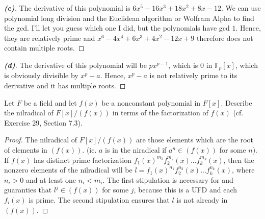 \documentclass[10pt]{article}
\newenvironment{problem}[2][Problem]{\begin{trivlist}
		\item[\hskip \labelsep {\bfseries #1}\hskip \labelsep {\bfseries #2.}]}{\end{trivlist}}
\begin{document}
\begin{problem}{4.19}
		\begin{proof}[\textbf{(c)}]
			The derivative of this polynomial is $6x^5 - 16x^3 + 18x^2 + 8x - 12$. We can use polynomial long division and the Euclidean algorithm or Wolfram Alpha to find the gcd. I'll let you guess which one I did, but the polynomials have gcd $1$. Hence, they are relatively prime and $x^6 - 4x^4 + 6x^3 + 4x^2 - 12x + 9$ therefore does not contain multiple roots.
		\end{proof}

		\begin{proof}[\textbf{(d)}]
			The derivative of this polynomial will be $px^{p-1}$, which is $0$ in $\mathbb{F}_p[x]$, which is obviously divisible by $x^p-a$. Hence, $x^p-a$ is not relatively prime to its derivative and it has multiple roots.
		\end{proof}
	\end{problem}


	\begin{problem}{5.1}
		Let $F$ be a field and let $f(x)$ be a nonconstant polynomial in $F[x]$. Describe the nilradical
		of $F[x]/(f(x))$ in terms of the factorization of $f(x)$ (cf. Exercise 29, Section 7.3).
		\begin{proof}
			The nilradical of $F[x]/(f(x))$ are those elements which are the root of elements in $(f(x))$. (ie. $a$ is in the niradical if $a^n \in (f(x))$ for some $n$). If $f(x)$ has distinct prime factorization $f_1(x)^{m_1}f_2^{m_2}(x)...f_k^{m_k}(x)$, then the nonzero elements of the nilradical will be $l = f_1(x)^{n_1}f_2^{n_2}(x)...f_k^{n_k}(x)$, where $n_i > 0$ and at least one $n_i < m_i$. The first stipulation is necessary for and guaranties that $l^j \in (f(x))$ for some $j$, because this is a UFD and each $f_i(x)$ is prime. The second stipulation ensures that $l$ is not already in $(f(x))$.
		\end{proof}
	\end{problem}
	
\end{document}
